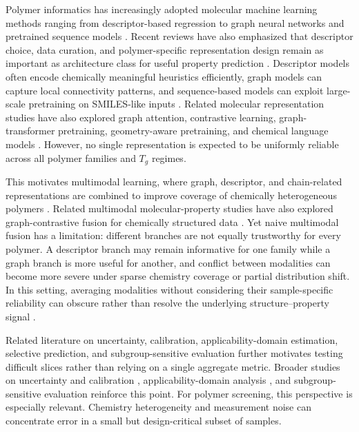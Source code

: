 \documentclass[review,12pt]{elsarticle}
\begin{document}
Polymer informatics has increasingly adopted molecular machine learning methods ranging from descriptor-based regression to graph neural networks and pretrained sequence models \cite{audus2017polymer,tao2021benchmarking,park2022prediction,antoniuk2022representing,kuenneth2023polybert,han2024multimodal,xu2023transpolymer}. Recent reviews have also emphasized that descriptor choice, data curation, and polymer-specific representation design remain as important as architecture class for useful property prediction \cite{chen2021currentstatus,zhao2023descriptorreview}. Descriptor models often encode chemically meaningful heuristics efficiently, graph models can capture local connectivity patterns, and sequence-based models can exploit large-scale pretraining on SMILES-like inputs \cite{park2022prediction,antoniuk2022representing,kuenneth2023polybert}. Related molecular representation studies have also explored graph attention, contrastive learning, graph-transformer pretraining, geometry-aware pretraining, and chemical language models \cite{xiong2020pushing,wang2022molclr,rong2020selfsupervised,liu2022pretraining3d,chithrananda2020chemberta}. However, no single representation is expected to be uniformly reliable across all polymer families and $T_g$ regimes.

This motivates multimodal learning, where graph, descriptor, and chain-related representations are combined to improve coverage of chemically heterogeneous polymers \cite{baltrusaitis2019multimodal,rollins2024molprop,han2024multimodal}. Related multimodal molecular-property studies have also explored graph-contrastive fusion for chemically structured data \cite{gong2025mdfcl}. Yet naive multimodal fusion has a limitation: different branches are not equally trustworthy for every polymer. A descriptor branch may remain informative for one family while a graph branch is more useful for another, and conflict between modalities can become more severe under sparse chemistry coverage or partial distribution shift. In this setting, averaging modalities without considering their sample-specific reliability can obscure rather than resolve the underlying structure--property signal \cite{neverova2016moddrop,zhang2023provable,gao2024embracing}.

Related literature on uncertainty, calibration, applicability-domain estimation, selective prediction, and subgroup-sensitive evaluation further motivates testing difficult slices rather than relying on a single aggregate metric. Broader studies on uncertainty and calibration \cite{abdar2021uncertainty,guo2017calibration}, applicability-domain analysis \cite{jaworska2005applicability}, and subgroup-sensitive evaluation \cite{geifman2019selectivenet,sagawa2020groupshift} reinforce this point. For polymer screening, this perspective is especially relevant. Chemistry heterogeneity and measurement noise can concentrate error in a small but design-critical subset of samples.
\end{document}
